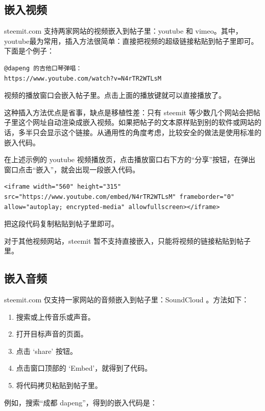 \documentclass[]{ctexbook}
\providecommand{\tightlist}{%
  \setlength{\itemsep}{0pt}\setlength{\parskip}{0pt}}
\begin{document}
\subsection{嵌入视频}

steemit.com 支持两家网站的视频嵌入到帖子里：youtube 和 vimeo。其中，youtube最为常用，插入方法很简单：直接把视频的超级链接粘贴到帖子里即可。下面是个例子：

\begin{verbatim}
@dapeng 的吉他口琴弹唱：
https://www.youtube.com/watch?v=N4rTR2WTLsM
\end{verbatim}

视频的播放窗口会嵌入帖子里。点击上面的播放键就可以直接播放了。

这种插入方法优点是省事，缺点是移植性差：只有 steemit 等少数几个网站会把帖子里这个网址自动渲染成嵌入视频。如果把帖子的文本原样贴到别的软件或网站的话，多半只会显示这个链接。从通用性的角度考虑，比较安全的做法是使用标准的嵌入代码。

在上述示例的 youtube 视频播放页，点击播放窗口右下方的``分享''按钮，在弹出窗口点击``嵌入''，就会出现一段嵌入代码。

\begin{verbatim}
<iframe width="560" height="315" src="https://www.youtube.com/embed/N4rTR2WTLsM" frameborder="0" allow="autoplay; encrypted-media" allowfullscreen></iframe>
\end{verbatim}

把这段代码复制粘贴到帖子里即可。

对于其他视频网站，steemit 暂不支持直接嵌入，只能将视频的链接粘贴到帖子里。

\subsection{嵌入音频}

steemit.com 仅支持一家网站的音频嵌入到帖子里：SoundCloud 。方法如下：

\begin{enumerate}
\def\labelenumi{\arabic{enumi}.}
\tightlist
\item
  搜索或上传音乐或声音。
\item
  打开目标声音的页面。
\item
  点击 `share' 按钮。
\item
  点击窗口顶部的 `Embed'，就得到了代码。
\item
  将代码拷贝粘贴到帖子里。
\end{enumerate}

例如，搜索``成都 dapeng''，得到的嵌入代码是：
\end{document}
